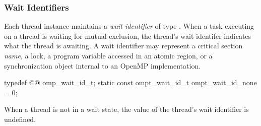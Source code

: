 \subsubsection{Wait Identifiers}

\label{sec:omp_wait_id_t} 

Each thread instance maintains a \emph{wait identifier} of type .
When a task executing on a thread is waiting for mutual exclusion, the thread's wait identifer indicates what the thread is awaiting.
A wait identifier may represent a critical section {\em name}, a lock, a program variable accessed in an atomic region, or a synchronization object internal to an OpenMP implementation.


\begin{ccppspecific}
\begin{omptOther}
typedef @\ulonglongint{}@ omp_wait_id_t;
static const ompt_wait_id_t ompt_wait_id_none = 0;
\end{omptOther}
\end{ccppspecific}


When a thread is not in a wait state, the value of the thread's wait identifier is undefined.

